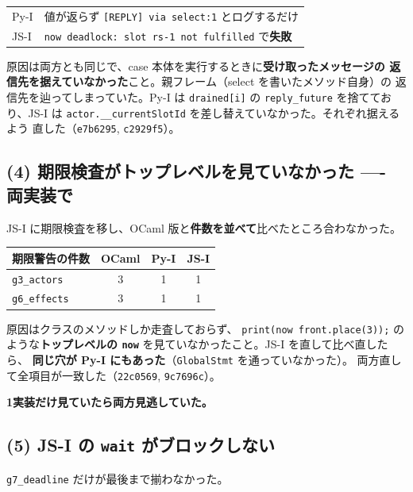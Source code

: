 \documentclass[11pt,a4paper]{ltjsarticle}
\begin{document}
\begin{center}
\small
\begin{tabular}{@{}ll@{}}
\toprule
Py-I & 値が返らず \texttt{[REPLY] via select:1} とログするだけ \\
JS-I & \texttt{now deadlock: slot rs-1 not fulfilled} で\textbf{失敗} \\
\bottomrule
\end{tabular}
\end{center}

原因は両方とも同じで、case 本体を実行するときに\textbf{受け取ったメッセージの
返信先を据えていなかった}こと。親フレーム（select を書いたメソッド自身）の
返信先を辿ってしまっていた。Py-I は \texttt{drained[i]} の
\texttt{reply\_future} を捨てており、JS-I は
\texttt{actor.\_\_currentSlotId} を差し替えていなかった。それぞれ据えるよう
直した（\texttt{e7b6295}, \texttt{c2929f5}）。

\subsection{(4) 期限検査がトップレベルを見ていなかった ---- 両実装で}

JS-I に期限検査を移し、OCaml 版と\textbf{件数を並べて}比べたところ合わなかった。

\begin{center}
\small
\begin{tabular}{@{}lccc@{}}
\toprule
期限警告の件数 & OCaml & Py-I & JS-I \\
\midrule
\texttt{g3\_actors} & 3 & 1 & 1 \\
\texttt{g6\_effects} & 3 & 1 & 1 \\
\bottomrule
\end{tabular}
\end{center}

原因はクラスのメソッドしか走査しておらず、
\texttt{print(now front.place(3));} のような\textbf{トップレベルの
\texttt{now}} を見ていなかったこと。JS-I を直して比べ直したら、
\textbf{同じ穴が Py-I にもあった}（\texttt{GlobalStmt} を通っていなかった）。
両方直して全項目が一致した（\texttt{22c0569}, \texttt{9c7696c}）。

\textbf{1実装だけ見ていたら両方見逃していた。}

\subsection{(5) JS-I の \texttt{wait} がブロックしない}

\texttt{g7\_deadline} だけが最後まで揃わなかった。
\end{document}
